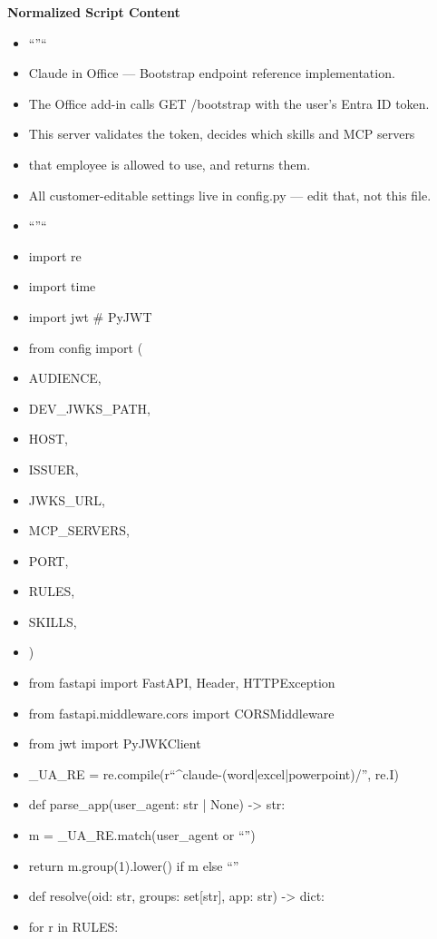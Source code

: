 \documentclass[11pt]{article}
\begin{document}
\textbf{Normalized Script Content}
\begin{itemize}[leftmargin=*,itemsep=2pt,topsep=2pt]
\item {} ``''``
\item {} Claude in Office — Bootstrap endpoint reference implementation.
\item {} The Office add-in calls GET /bootstrap with the user's Entra ID token.
\item {} This server validates the token, decides which skills and MCP servers
\item {} that employee is allowed to use, and returns them.
\item {} All customer-editable settings live in config.py — edit that, not this file.
\item {} ``''``
\item {} import re
\item {} import time
\item {} import jwt \# PyJWT
\item {} from config import (
\item {} AUDIENCE,
\item {} DEV\_\allowbreak{}JWKS\_\allowbreak{}PATH,
\item {} HOST,
\item {} ISSUER,
\item {} JWKS\_\allowbreak{}URL,
\item {} MCP\_\allowbreak{}SERVERS,
\item {} PORT,
\item {} RULES,
\item {} SKILLS,
\item {} )
\item {} from fastapi import FastAPI, Header, HTTPException
\item {} from fastapi.middleware.cors import CORSMiddleware
\item {} from jwt import PyJWKClient
\item {} \_\allowbreak{}UA\_\allowbreak{}RE = re.compile(r``\textasciicircum{}claude-(word|excel|powerpoint)/'', re.I)
\item {} def parse\_\allowbreak{}app(user\_\allowbreak{}agent: str | None) -> str:
\item {} m = \_\allowbreak{}UA\_\allowbreak{}RE.match(user\_\allowbreak{}agent or ``'')
\item {} return m.group(1).lower() if m else ``''
\item {} def resolve(oid: str, groups: set[str], app: str) -> dict:
\item {} for r in RULES:

\end{itemize}
\end{document}
